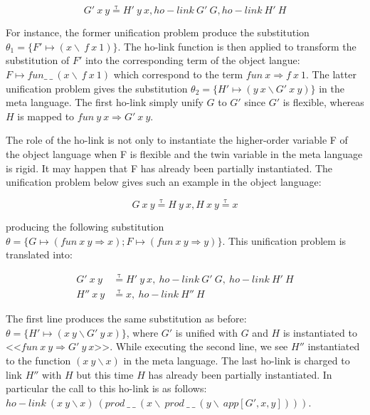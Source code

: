 \documentclass[sigconf,natbib=false]{acmart}
\newcommand*{\eqtau}{\ensuremath{\mathrel{\overset{\mathrm{\tau}}{=}}}}
\begin{document}
\begin{equation}
  G'\ x\ y \eqtau H'\ y\ x, ho-link\ G'\ G, ho-link\ H'\ H
  \label{eq:unif-ho-elpi2'}
\end{equation}

For instance, the former unification problem produce the substitution $\theta_1
= \{F' \mapsto (x\backslash\ f\ x\ 1)\}$. The ho-link function is then applied
to transform the substitution of $F'$ into the corresponding term of the object
langue: $F \mapsto fun \_\ \_\ (x\backslash\ f\ x\ 1)$ which correspond to the
term $fun\ x \Rightarrow f\ x\ 1$. The latter unification problem gives the
substitution $\theta_2 = \{H' \mapsto (y\ x \backslash G'\ x\ y)\}$ in the
meta language. The first ho-link simply unify $G$ to $G'$ since $G'$ is
flexible, whereas $H$ is mapped to $fun\ y\ x \Rightarrow G'\ x\ y$.

The role of the ho-link is not only to instantiate the higher-order variable F
of the object language when F is flexible and the twin variable in the meta
language is rigid. It may happen that F has already been partially instantiated.
The unification problem below gives such an example in the object language:

\begin{equation}
  G\ x\ y \eqtau H\ y\ x, H\ x\ y \eqtau x 
  \label{eq:unif-ho-coq4}
\end{equation}

\noindent producing the following substitution $\theta = \{G \mapsto (fun\ x\
y\Rightarrow x); F \mapsto (fun\ x\ y\Rightarrow y)\}$. This unification problem
is translated into:

\begin{equation}
  \begin{split}
    G'\ x\ y &\eqtau H'\ y\ x,\ ho-link\ G'\ G,\ ho-link\ H'\ H\\
    H''\ x\ y &\eqtau x,\ ho-link\ H''\ H
  \end{split}
  \label{eq:unif-ho-elpi4}
\end{equation}

\noindent The first line produces the same substitution as before: $\theta = \{H'
\mapsto (x\ y \backslash G'\ y\ x)\}$, where $G'$ is unified with $G$ and $H$ is
instantiated to <<$fun\ x\ y \Rightarrow G'\ y\ x$>>. While executing the second
line, we see $H''$ instantiated to the function $(x\ y\backslash x)$ in the
meta language. The last ho-link is charged to link $H''$ with $H$ but this
time $H$ has already been partially instantiated. In particular the call to this
ho-link is as follows: $ho-link\ (x\ y\backslash x)\
(prod\ \_\ \_\ (x\backslash\ prod\ \_\ \_\ (y\backslash\ app [G', x, y])))$.
\end{document}
